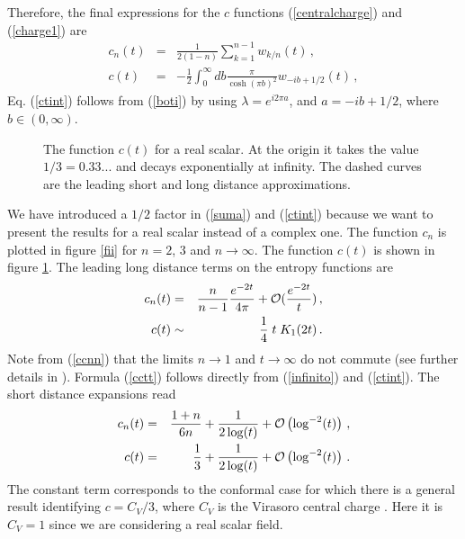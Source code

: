 \documentclass[a4paper]{article}
\begin{document}
Therefore, the final expressions for the $c$ functions (\ref{centralcharge}) and (\ref{charge1}) are
\begin{eqnarray}
c_n(t)&=&\frac{1}{2(1-n)}\sum_{k=1}^{n-1} w_{k/n}(t)\label{suma}\,,\\
c(t)&=&-\frac{1}{2}\int_0^{\infty}db \frac{\pi}{\cosh(\pi b)^2}w_{-i b+1/2}(t)\label{ctint}\,,
\end{eqnarray}
Eq. (\ref{ctint}) follows from (\ref{boti}) by using $\lambda=e^{i 2\pi a}$, and $a=-i b+1/2$, where $b\in (0, \infty)$.
\begin{figure} [tbp]
\centering
\leavevmode
\epsfxsize=7.5cm
\bigskip
{}
\caption{The function $c(t)$ for a real scalar. At the origin it takes the value $1/3=0.33...$ and decays exponentially at infinity. The dashed curves are the leading short and long distance approximations.}\label{fiiii}
\end{figure}
We have introduced a $1/2$ factor in (\ref{suma}) and (\ref{ctint}) because we want to present the results for a real scalar  instead of a complex one. The function $c_n$ is plotted in figure \ref{fii} for $n=2$, $3$ and $n\rightarrow \infty$. The function $c(t)$ is shown in figure \ref{fiiii}.
The leading long distance terms on the entropy functions are
\begin{eqnarray}
c_{n }(t)&=&\frac{n}{n-1}\frac{e^{-2t}}{4\pi}+{\cal O}(\frac{e^{-2t}}{t})\,,\label{ccnn}\\
c(t)&\sim& \frac{1}{4}\;t \;K_1(2t) \label{cctt}\,.
\end{eqnarray}
Note from (\ref{ccnn}) that the limits $n\rightarrow1$ and $t\rightarrow\infty$ do not commute (see further details in \cite{fermion,dc}). Formula (\ref{cctt}) follows directly from (\ref{infinito}) and (\ref{ctint}). The short distance expansions read
\begin{eqnarray}
c_n(t)&=&\frac{1+n}{6 n}+\frac{1}{2\log(t)}+{\cal O}\left(\log^{-2}(t)\right)\,,\\
c(t)&=&\frac{1}{3}+\frac{1}{2\log(t)}+{\cal O}\left(\log^{-2}(t)\right)\,.\label{cuyas}
\end{eqnarray}
The constant term corresponds to the conformal case for which there is a general result identifying $c=C_V/3$, where $C_V$ is the Virasoro central charge \cite{ci,cc}. Here it is $C_V=1$ since we are considering a real scalar field.
\end{document}
